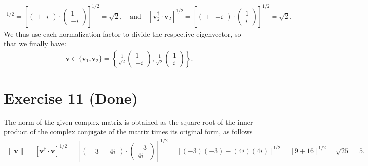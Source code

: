 \documentclass[letterpaper,11pt,twoside]{article}
\begin{document}
\begin{align*}
  [\bm{v}_1^\dagger\cdot\bm{v}_1]^{1/2}=\left[\begin{pmatrix}
    1&i
  \end{pmatrix}\cdot\begin{pmatrix}
    1\\-i
  \end{pmatrix}\right]^{1/2}=\sqrt{2},\quad\text{and}\quad
  [\bm{v}_2^\dagger\cdot\bm{v}_2]^{1/2}=\left[\begin{pmatrix}
    1&-i
  \end{pmatrix}\cdot\begin{pmatrix}
    1\\i
  \end{pmatrix}\right]^{1/2}=\sqrt{2}.
\end{align*}
We thus use each normalization factor to divide the respective eigenvector, so that we finally have:
\begin{align*}
  \bm{v}\in\{\bm{v}_1,\bm{v}_2\}=\left\{\frac{1}{\sqrt{2}}\begin{pmatrix}
  1\\-i\end{pmatrix},\frac{1}{\sqrt{2}}\begin{pmatrix}
  1\\i\end{pmatrix}\right\}.
\end{align*}

\section{Exercise 11 (Done)} 
The norm of the given complex matrix is obtained as the square root of the inner product of the complex conjugate of the matrix times its
original form, as follows
\begin{align*}
  \|\bm{v}\|=[\bm{v}^\dagger\cdot\bm{v}]^{1/2}=\left[
    \begin{pmatrix}
      -3&-4i
    \end{pmatrix}\cdot\begin{pmatrix}
      -3\\4i
    \end{pmatrix}
  \right]^{1/2}=[(-3)(-3)-(4i)(4i)]^{1/2}=[9+16]^{1/2}=\sqrt{25}=5.
\end{align*}
\end{document}
